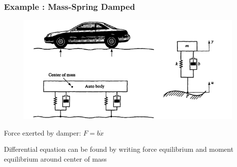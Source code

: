 \begin{frame}
	\frametitle{Example : Mass-Spring Damped}
	\begin{figure}
		\centering
		\includegraphics[width=1\linewidth]{img/mass-spring-damped}
		\label{fig:mass-spring-damped}
	\end{figure}
	Force exerted by damper: $F = b\dot{x}$
	
	Differential equation can be found by writing force equilibrium and moment equilibrium around center of mass
	
\end{frame}

